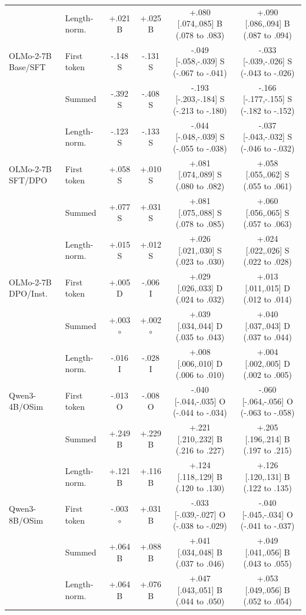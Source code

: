 \begin{table}[t]
\begin{tabular}{@{}llcccc@{}}
 & Length-norm. & +.021 B & +.025 B & +.080 [.074,.085] B (.078 to .083) & +.090 [.086,.094] B (.087 to .094) \\
\addlinespace[1pt]
OLMo-2-7B Base/SFT & First token & -.148 S & -.131 S & -.049 [-.058,-.039] S (-.067 to -.041) & -.033 [-.039,-.026] S (-.043 to -.026) \\
 & Summed & -.392 S & -.408 S & -.193 [-.203,-.184] S (-.213 to -.180) & -.166 [-.177,-.155] S (-.182 to -.152) \\
 & Length-norm. & -.123 S & -.133 S & -.044 [-.048,-.039] S (-.055 to -.038) & -.037 [-.043,-.032] S (-.046 to -.032) \\
\addlinespace[1pt]
OLMo-2-7B SFT/DPO & First token & +.058 S & +.010 S & +.081 [.074,.089] S (.080 to .082) & +.058 [.055,.062] S (.055 to .061) \\
 & Summed & +.077 S & +.031 S & +.081 [.075,.088] S (.078 to .085) & +.060 [.056,.065] S (.057 to .063) \\
 & Length-norm. & +.015 S & +.012 S & +.026 [.021,.030] S (.023 to .030) & +.024 [.022,.026] S (.022 to .028) \\
\addlinespace[1pt]
OLMo-2-7B DPO/Inst. & First token & +.005 D & -.006 I & +.029 [.026,.033] D (.024 to .032) & +.013 [.011,.015] D (.012 to .014) \\
 & Summed & +.003 $\circ$ & +.002 $\circ$ & +.039 [.034,.044] D (.035 to .043) & +.040 [.037,.043] D (.037 to .044) \\
 & Length-norm. & -.016 I & -.028 I & +.008 [.006,.010] D (.006 to .010) & +.004 [.002,.005] D (.002 to .005) \\
\addlinespace[1pt]
Qwen3-4B/OSim & First token & -.013 O & -.008 O & -.040 [-.044,-.035] O (-.044 to -.034) & -.060 [-.064,-.056] O (-.063 to -.058) \\
 & Summed & +.249 B & +.229 B & +.221 [.210,.232] B (.216 to .227) & +.205 [.196,.214] B (.197 to .215) \\
 & Length-norm. & +.121 B & +.116 B & +.124 [.118,.129] B (.120 to .130) & +.126 [.120,.131] B (.122 to .135) \\
\addlinespace[1pt]
Qwen3-8B/OSim & First token & -.003 $\circ$ & +.031 B & -.033 [-.039,-.027] O (-.038 to -.029) & -.040 [-.045,-.034] O (-.041 to -.037) \\
 & Summed & +.064 B & +.088 B & +.041 [.034,.048] B (.037 to .046) & +.049 [.041,.056] B (.043 to .055) \\
 & Length-norm. & +.064 B & +.076 B & +.047 [.043,.051] B (.044 to .050) & +.053 [.049,.056] B (.052 to .054) \\

\end{tabular}
\end{table}
